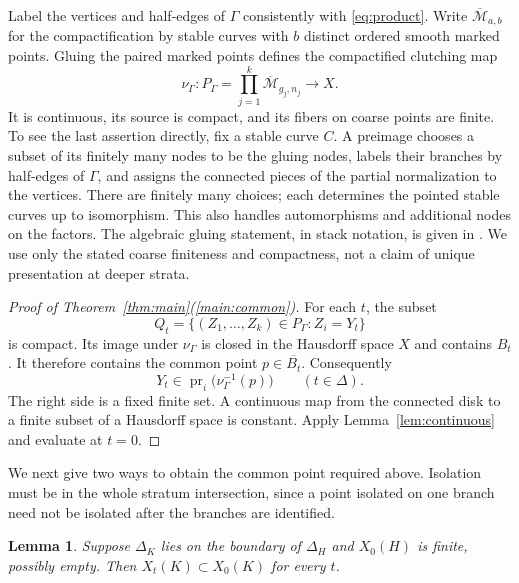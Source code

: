 \documentclass[11pt]{article}
\newcommand{\Mb}{\overline{\mathcal M}}
\newcommand{\cl}[1]{\overline{#1}}
\DeclareMathOperator{\pr}{pr}
\newtheorem{lemma}[theorem]{Lemma}
\theoremstyle{definition}
\theoremstyle{remark}
\begin{document}
Label the vertices and half-edges of $\Gamma$ consistently with \eqref{eq:product}. Write $\Mb_{a,b}$ for the compactification by stable curves with $b$ distinct ordered smooth marked points. Gluing the paired marked points defines the compactified clutching map
\begin{equation}\label{eq:clutch}
 \nu_\Gamma:P_\Gamma=\prod_{j=1}^k\Mb_{g_j,n_j}\longrightarrow X.
\end{equation}
It is continuous, its source is compact, and its fibers on coarse points are finite. To see the last assertion directly, fix a stable curve $C$. A preimage chooses a subset of its finitely many nodes to be the gluing nodes, labels their branches by half-edges of $\Gamma$, and assigns the connected pieces of the partial normalization to the vertices. There are finitely many choices; each determines the pointed stable curves up to isomorphism. This also handles automorphisms and additional nodes on the factors. The algebraic gluing statement, in stack notation, is given in \cite[Definition~4.1, p.~175, and Proposition~4.4, p.~176]{EF}. We use only the stated coarse finiteness and compactness, not a claim of unique presentation at deeper strata.

\begin{proof}[Proof of Theorem~\ref{thm:main}(\ref{main:common})]
For each $t$, the subset
\[
 Q_t=\{(Z_1,\ldots,Z_k)\in P_\Gamma:Z_i=Y_t\}
\]
is compact. Its image under $\nu_\Gamma$ is closed in the Hausdorff space $X$ and contains $B_t$. It therefore contains the common point $p\in\cl{B_t}$. Consequently
\begin{equation}\label{eq:finite-values}
 Y_t\in\pr_i\bigl(\nu_\Gamma^{-1}(p)\bigr)\qquad(t\in\Delta).
\end{equation}
The right side is a fixed finite set. A continuous map from the connected disk to a finite subset of a Hausdorff space is constant. Apply Lemma~\ref{lem:continuous} and evaluate at $t=0$.
\end{proof}

We next give two ways to obtain the common point required above. Isolation must be in the whole stratum intersection, since a point isolated on one branch need not be isolated after the branches are identified.

\begin{lemma}\label{lem:finite-ancestor}
Suppose $\Delta_K$ lies on the boundary of $\Delta_H$ and $X_0(H)$ is finite, possibly empty. Then $X_t(K)\subset X_0(K)$ for every $t$.
\end{lemma}
\end{document}
